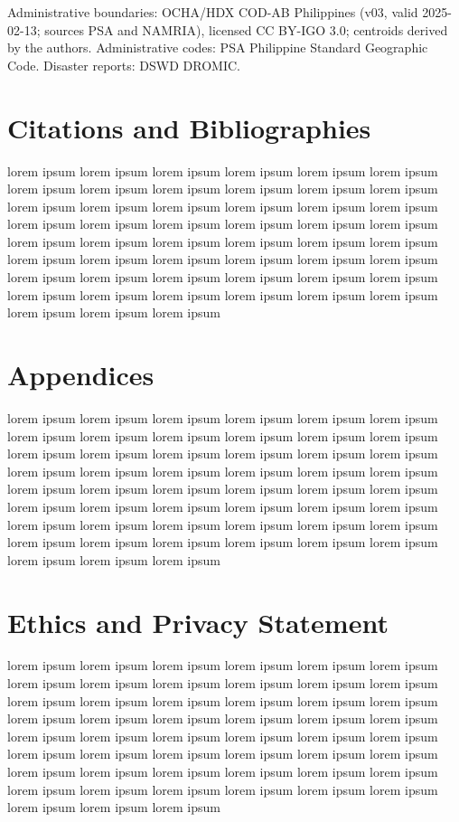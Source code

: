 \documentclass[acmtog]{acmart}
\begin{document}
Administrative boundaries: OCHA/HDX COD-AB Philippines (v03, valid 2025-02-13; sources PSA and
NAMRIA), licensed CC BY-IGO 3.0; centroids derived by the authors. Administrative codes: PSA
Philippine Standard Geographic Code. Disaster reports: DSWD DROMIC.

\section{Citations and Bibliographies}

lorem ipsum  lorem ipsum  lorem ipsum  lorem ipsum  lorem ipsum  lorem ipsum  lorem ipsum  lorem ipsum  lorem ipsum  lorem ipsum  lorem ipsum  lorem ipsum  lorem ipsum  lorem ipsum  lorem ipsum  lorem ipsum  lorem ipsum  lorem ipsum  lorem ipsum  lorem ipsum  lorem ipsum  lorem ipsum  lorem ipsum  lorem ipsum  lorem ipsum  lorem ipsum  lorem ipsum  lorem ipsum  lorem ipsum  lorem ipsum  lorem ipsum  lorem ipsum  lorem ipsum  lorem ipsum  lorem ipsum  lorem ipsum  lorem ipsum  lorem ipsum  lorem ipsum  lorem ipsum  lorem ipsum  lorem ipsum  lorem ipsum  lorem ipsum  lorem ipsum  lorem ipsum  lorem ipsum  lorem ipsum  lorem ipsum  lorem ipsum  lorem ipsum  

\section{Appendices}

lorem ipsum  lorem ipsum  lorem ipsum  lorem ipsum  lorem ipsum  lorem ipsum  lorem ipsum  lorem ipsum  lorem ipsum  lorem ipsum  lorem ipsum  lorem ipsum  lorem ipsum  lorem ipsum  lorem ipsum  lorem ipsum  lorem ipsum  lorem ipsum  lorem ipsum  lorem ipsum  lorem ipsum  lorem ipsum  lorem ipsum  lorem ipsum  lorem ipsum  lorem ipsum  lorem ipsum  lorem ipsum  lorem ipsum  lorem ipsum  lorem ipsum  lorem ipsum  lorem ipsum  lorem ipsum  lorem ipsum  lorem ipsum  lorem ipsum  lorem ipsum  lorem ipsum  lorem ipsum  lorem ipsum  lorem ipsum  lorem ipsum  lorem ipsum  lorem ipsum  lorem ipsum  lorem ipsum  lorem ipsum  lorem ipsum  lorem ipsum  lorem ipsum  

\section*{Ethics and Privacy Statement}

lorem ipsum  lorem ipsum  lorem ipsum  lorem ipsum  lorem ipsum  lorem ipsum  lorem ipsum  lorem ipsum  lorem ipsum  lorem ipsum  lorem ipsum  lorem ipsum  lorem ipsum  lorem ipsum  lorem ipsum  lorem ipsum  lorem ipsum  lorem ipsum  lorem ipsum  lorem ipsum  lorem ipsum  lorem ipsum  lorem ipsum  lorem ipsum  lorem ipsum  lorem ipsum  lorem ipsum  lorem ipsum  lorem ipsum  lorem ipsum  lorem ipsum  lorem ipsum  lorem ipsum  lorem ipsum  lorem ipsum  lorem ipsum  lorem ipsum  lorem ipsum  lorem ipsum  lorem ipsum  lorem ipsum  lorem ipsum  lorem ipsum  lorem ipsum  lorem ipsum  lorem ipsum  lorem ipsum  lorem ipsum  lorem ipsum  lorem ipsum  lorem ipsum  
\end{document}
